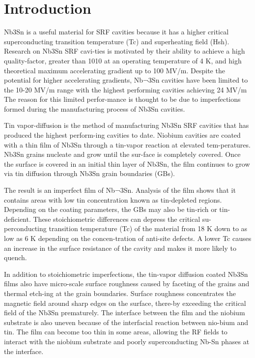 
\section{Introduction}

Nb3Sn is a useful material for SRF cavities because it has a higher critical superconducting transition temperature (Tc) and superheating field (Hsh). Research on Nb3Sn SRF cavi-ties is motivated by their ability to achieve a high quality-factor, greater than 1010 at an operating temperature of 4 K, and high theoretical maximum accelerating gradient up to 100 MV/m. Despite the potential for higher accelerating gradients, Nb¬3Sn cavities have been limited to the 10-20 MV/m range with the highest performing cavities achieving 24 MV/m\cite{posen2021advances} The reason for this limited perfor-mance is thought to be due to imperfections formed during the manufacturing process of Nb3Sn cavities. 

Tin vapor-diffusion is the method of manufacturing Nb3Sn SRF cavities that has produced the highest perform-ing cavities to date. Niobium cavities are coated with a thin film of Nb3Sn through a tin-vapor reaction at elevated tem-peratures\cite{posen2021advances,pudasaini2019growth}. Nb3Sn grains nucleate and grow until the sur-face is completely covered. Once the surface is covered in an initial thin layer of Nb3Sn, the film continues to grow via tin diffusion through Nb3Sn grain boundaries (GBs)\cite{pudasaini2019growth}. 

The result is an imperfect film of Nb¬3Sn. Analysis of the film shows that it contains areas with low tin concentration known as tin-depleted regions\cite{lee2018atomic}. Depending on the coating parameters, the GBs may also be tin-rich or tin-deficient\cite{lee2020grain}. These stoichiometric differences can depress the critical su-perconducting transition temperature (Tc) of the material from 18 K down to as low as 6 K depending on the concen-tration of anti-site defects\cite{sitaraman2021effect}. A lower Tc causes an increase in the surface resistance of the cavity and makes it more likely to quench.

In addition to stoichiometric imperfections, the tin-vapor diffusion coated Nb3Sn films also have micro-scale surface roughness caused by faceting of the grains and thermal etch-ing at the grain boundaries. Surface roughness concentrates the magnetic field around sharp edges on the surface, there-by exceeding the critical field of the Nb3Sn prematurely\cite{porter2016surface}. The interface between the film and the niobium substrate is also uneven because of the interfacial reaction between nio-bium and tin\cite{lee2018atomic}. The film can become too thin in some areas, allowing the RF fields to interact with the niobium substrate and poorly superconducting Nb-Sn phases at the interface.

